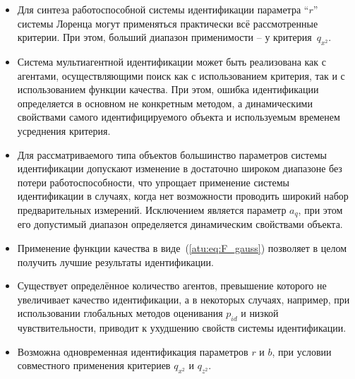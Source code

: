 \begin{itemize}

  \item
    Для синтеза работоспособной системы идентификации параметра  ``$r$''
    системы Лоренца могут применяться практически всё рассмотренные критерии.
    При этом, больший диапазон применимости -- у критерия~$q_{x^2}$.

  \item
    Система мультиагентной идентификации может быть
    реализована как с агентами, осуществляющими поиск
    как с использованием критерия, так и с использованием
    функции качества. При этом, ошибка идентификации
    определяется в основном не конкретным методом,
    а динамическими свойствами самого идентифицируемого
    объекта и используемым временем усреднения критерия.

  \item
    Для рассматриваемого типа объектов большинство параметров
    системы идентификации допускают изменение в достаточно
    широком диапазоне без потери работоспособности,
    что упрощает применение системы идентификации
    в случаях, когда нет возможности проводить
    широкий набор предварительных измерений.
    Исключением является параметр $a_q$, при этом его допустимый диапазон
    определяется динамическим свойствами объекта.

  \item
    Применение функции качества в виде~(\ref{atu:eq:F_gauss})
    позволяет в целом получить лучшие результаты идентификации.

  \item
    Существует определённое количество агентов,
    превышение которого не увеличивает качество идентификации,
    а в некоторых случаях, например, при использовании глобальных
    методов оценивания $p_{id}$ и низкой чувствительности,
    приводит к ухудшению свойств системы идентификации.

  \item
    Возможна одновременная идентификация параметров $r$ и $b$,
    при условии совместного применения критериев $q_{x^2}$ и $q_{z^2}$.

\end{itemize}





